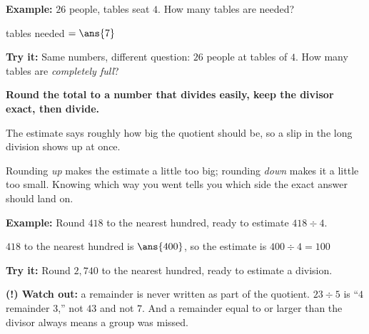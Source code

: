 \documentclass[12pt]{article}
\begin{document}
\begin{examplebox}
\textbf{Example:} \quad $26$ people, tables seat $4$. How many tables are needed?

tables needed $= \ans{7}$
\end{examplebox}

\begin{tryitbox}
\textbf{Try it:} \quad Same numbers, different question: $26$ people at tables of $4$. How many tables
are \emph{completely full}?\\[2pt]
\end{tryitbox}


\begin{formulabox}
\textbf{Round the total to a number that divides easily, keep the divisor exact, then divide.}\par
The estimate says roughly how big the quotient should be, so a slip in the long division shows up at
once.\par
Rounding \emph{up} makes the estimate a little too big; rounding \emph{down} makes it a little too
small. Knowing which way you went tells you which side the exact answer should land on.
\end{formulabox}

\begin{examplebox}
\textbf{Example:} \quad Round $418$ to the nearest hundred, ready to estimate $418 \div 4$.

$418$ to the nearest hundred is $\ans{400}$, so the estimate is $400 \div 4 = 100$
\end{examplebox}

\begin{tryitbox}
\textbf{Try it:} \quad Round $2{,}740$ to the nearest hundred, ready to estimate a division.\\[2pt]
\end{tryitbox}

\begin{watchoutbox}
\textbf{(!) Watch out:} a remainder is never written as part of the quotient. $23 \div 5$ is
``$4$ remainder $3$,'' not $43$ and not $7$. And a remainder equal to or larger than the divisor
always means a group was missed.
\end{watchoutbox}
\end{document}

